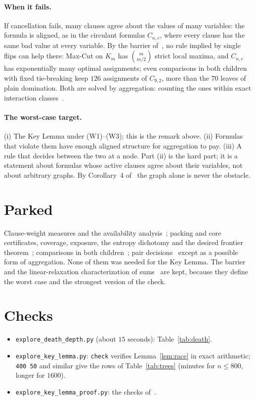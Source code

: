\documentclass[11pt,a4paper]{article}
\theoremstyle{definition}
\theoremstyle{remark}
\begin{document}
\paragraph{When it fails.} If cancellation fails, many clauses agree about the
values of many variables: the formula is aligned, as in the circulant formulas
$C_{n,c}$, where every clause has the same bad value at every variable. By the
barrier of~\cite[Section~9]{N4}, no rule implied by single flips can help
there: Max-Cut on $K_m$ has $\binom m{m/2}$ strict local maxima, and $C_{n,c}$
has exponentially many optimal assignments; even comparisons in both children
with fixed tie-breaking keep $126$ assignments of $C_{9,2}$, more than the $70$
leaves of plain domination. Both are solved by aggregation: counting the ones
within exact interaction classes~\cite[Section~5]{N5}.

\paragraph{The worst-case target.} (i) The Key Lemma under (W1)--(W3); this
is the remark above. (ii) Formulas that violate them have enough aligned
structure for aggregation to pay. (iii) A rule that decides between the two at
a node. Part (ii) is the hard part; it is a statement about formulas whose
active clauses agree about their variables, not about arbitrary graphs. By
Corollary~4 of~\cite{N8} the graph alone is never the obstacle.

\section{Parked}\label{sec:parked}

Clause-weight measures and the availability analysis~\cite[Sections~6--8]{N4};
packing and core certificates, coverage, exposure, the entropy dichotomy and the
desired frontier theorem~\cite{N5,N6}; comparisons in both children~\cite{N6};
pair decisions~\cite[Section~3]{N4} except as a possible form of aggregation.
None of them was needed for the Key Lemma. The barrier and the
linear-relaxation characterization of sums~\cite{N4} are kept, because they
define the worst case and the strongest version of the check.

\section{Checks}\label{sec:checks}

\begin{itemize}
 \item \texttt{explore\_death\_depth.py} (about $15$ seconds):
 Table~\ref{tab:death}.
 \item \texttt{explore\_key\_lemma.py}: \texttt{check} verifies
 Lemma~\ref{lem:race} in exact arithmetic; \texttt{400 50} and similar give
 the rows of Table~\ref{tab:trees} (minutes for $n\le800$, longer for $1600$).
 \item \texttt{explore\_key\_lemma\_proof.py}: the checks of~\cite{N8}.
\end{itemize}
\end{document}
